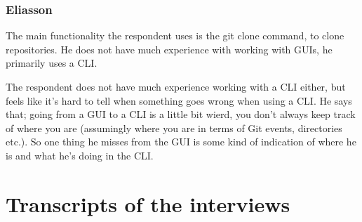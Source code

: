 \documentclass[a4paper,oneside]{bth} %
\begin{document}
		
		\subsection{Eliasson}
		The main functionality the respondent uses is the git clone command, to clone repositories.
		He does not have much experience with working with GUIs, he primarily uses a CLI.
		
		The respondent does not have much experience working with a CLI either, but feels like it’s hard to tell when something goes wrong when using a CLI.
		He says that; going from a GUI to a CLI is a little bit wierd, you don’t always keep track of where you are (assumingly where you are in terms of Git events, directories etc.).
		So one thing he misses from the GUI is some kind of indication of where he is and what he’s doing in the CLI.
		
		\chapter{Transcripts of the interviews}
\end{document}
